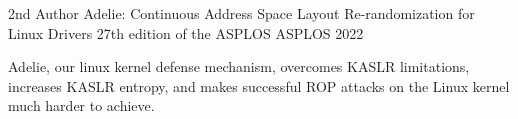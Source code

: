 

\begin{cventries}

  \cventry
    {2nd Author} %
    {Adelie: Continuous Address Space Layout Re-randomization for Linux Drivers} %
    {27th edition of the ASPLOS} %
    {ASPLOS 2022} %
    {
      \begin{cvitems} %
        \item {Adelie, our linux kernel defense mechanism, overcomes KASLR limitations, increases KASLR entropy, and makes successful ROP attacks on the Linux kernel much harder to achieve.}
      \end{cvitems}
    }

\end{cventries}
